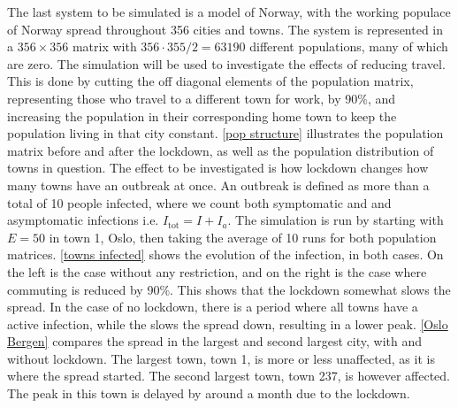 \documentclass{article}
\begin{document}
    The last system to be simulated is a model of Norway, with the working populace of Norway spread throughout 356 cities and towns. 
    The system is represented in a $356 \times 356$ matrix with $356 \cdot 355 /2 = 63190$ different populations, many of which are zero.
    The simulation will be used to investigate the effects of reducing travel.
    This is done by cutting the off diagonal elements of the population matrix, representing those who travel to a different town for work, by 90\%, and increasing the population in their corresponding home town to keep the population living in that city constant.
    \autoref{pop structure} illustrates the population matrix before and after the lockdown, as well as the population distribution of towns in question.
    The effect to be investigated is how lockdown changes how many towns have an outbreak at once.
    An outbreak is defined as more than a total of 10 people infected, where we count both symptomatic and and asymptomatic infections i.e. $I_\mathrm{tot}=I + I_a$.
    The simulation is run by starting with $E=50$ in town 1, Oslo, then taking the average of 10 runs for both population matrices.
    \autoref{towns infected} shows the evolution of the infection, in both cases. 
    On the left is the case without any restriction, and on the right is the case where commuting is reduced by 90\%. 
    This shows that the lockdown somewhat slows the spread.
    In the case of no lockdown, there is a period where all towns have a active infection, while the slows the spread down, resulting in a lower peak.
    \autoref{Oslo Bergen} compares the spread in the largest and second largest city, with and without lockdown.
    The largest town, town 1, is more or less unaffected, as it is where the spread started.
    The second largest town, town 237, is however affected.
    The peak in this town is delayed by around a month due to the lockdown.
\end{document}
